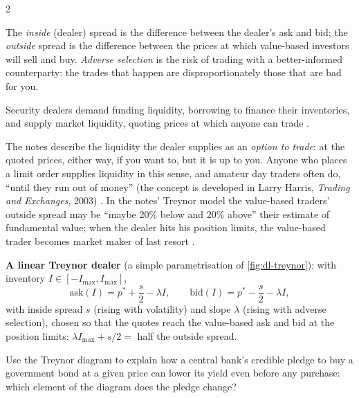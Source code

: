 \begin{paracol}{2}
\begin{definition}
The \emph{inside} (dealer) spread is the difference between the dealer's ask and bid; the \emph{outside} spread is the difference between the prices at which value-based investors
will sell and buy. \emph{Adverse selection} is the risk of trading with a better-informed counterparty: the trades that happen are disproportionately those that are bad for you.
\end{definition}

\begin{proposition}
Security dealers demand funding liquidity, borrowing to finance their inventories, and supply market liquidity, quoting prices at which anyone can trade .
\end{proposition}

The notes describe the liquidity the dealer supplies as an \emph{option to trade}: at the quoted prices, either way, if you want to, but it is up to you. Anyone who places a limit order
supplies liquidity in this sense, and amateur day traders often do, ``until they run out of money'' (the concept is developed in Larry Harris, \emph{Trading and Exchanges}, 2003)
. In the notes' Treynor model the value-based traders' outside spread may be ``maybe 20\% below and 20\% above'' their estimate of fundamental value; when the dealer hits his
position limits, the value-based trader becomes market maker of last resort .

\begin{keyformulas}
\textbf{A linear Treynor dealer} (a simple parametrisation of \cref{fig:dl-treynor}): with inventory $I\in[-I_{\max},I_{\max}]$,
\[
  \text{ask}(I) = p^\ast + \frac{s}{2} - \lambda I ,\qquad \text{bid}(I) = p^\ast - \frac{s}{2} - \lambda I ,
\]
with inside spread $s$ (rising with volatility) and slope $\lambda$ (rising with adverse selection), chosen so that the quotes reach the value-based ask and bid at the position
limits: $\lambda I_{\max} + s/2 = $ half the outside spread.
\end{keyformulas}

\begin{exercise}
Use the Treynor diagram to explain how a central bank's credible pledge to buy a government bond at a given price can lower its yield even before any purchase: which element of the diagram does the
pledge change?
\end{exercise}


\end{paracol}

